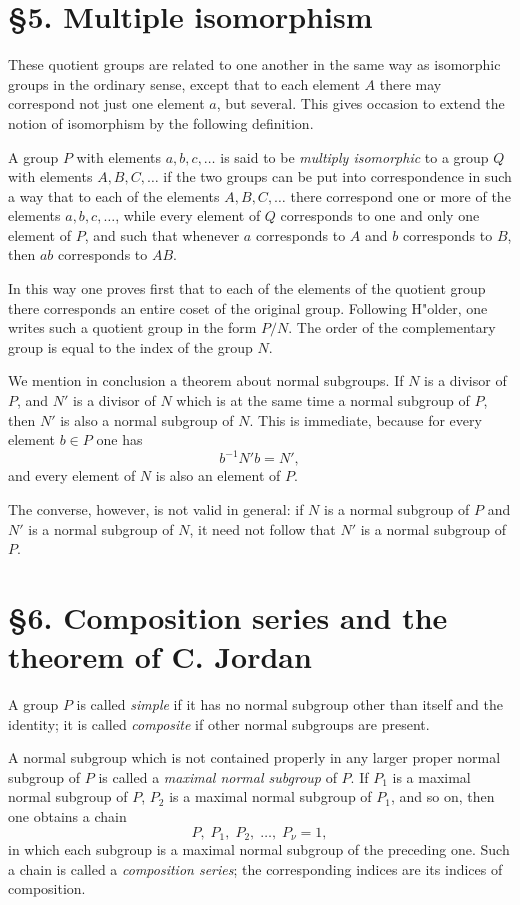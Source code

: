 \documentclass[11pt]{article}
\begin{document}
\section*{§5. Multiple isomorphism}
These quotient groups are related to one another in the same way as isomorphic groups in the ordinary sense, except that to each element $A$ there may correspond not just one element $a$, but several. This gives occasion to extend the notion of isomorphism by the following definition.

A group $P$ with elements $a,b,c,\dots$ is said to be \emph{multiply isomorphic} to a group $Q$ with elements $A,B,C,\dots$ if the two groups can be put into correspondence in such a way that to each of the elements $A,B,C,\dots$ there correspond one or more of the elements $a,b,c,\dots$, while every element of $Q$ corresponds to one and only one element of $P$, and such that whenever $a$ corresponds to $A$ and $b$ corresponds to $B$, then $ab$ corresponds to $AB$.

In this way one proves first that to each of the elements of the quotient group there corresponds an entire coset of the original group. Following H"older, one writes such a quotient group in the form $P/N$. The order of the complementary group is equal to the index of the group $N$.

We mention in conclusion a theorem about normal subgroups. If $N$ is a divisor of $P$, and $N'$ is a divisor of $N$ which is at the same time a normal subgroup of $P$, then $N'$ is also a normal subgroup of $N$. This is immediate, because for every element $b\in P$ one has
\[
 b^{-1}N'b = N',
\]
and every element of $N$ is also an element of $P$.

The converse, however, is not valid in general: if $N$ is a normal subgroup of $P$ and $N'$ is a normal subgroup of $N$, it need not follow that $N'$ is a normal subgroup of $P$.

\section*{§6. Composition series and the theorem of C. Jordan}
A group $P$ is called \emph{simple} if it has no normal subgroup other than itself and the identity; it is called \emph{composite} if other normal subgroups are present.

A normal subgroup which is not contained properly in any larger proper normal subgroup of $P$ is called a \emph{maximal normal subgroup} of $P$. If $P_1$ is a maximal normal subgroup of $P$, $P_2$ is a maximal normal subgroup of $P_1$, and so on, then one obtains a chain
\[
 P,\; P_1,\; P_2,\; \dots,\; P_\nu = 1,
\]
in which each subgroup is a maximal normal subgroup of the preceding one. Such a chain is called a \emph{composition series}; the corresponding indices are its indices of composition.
\end{document}
